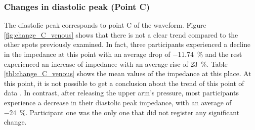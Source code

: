 \subsubsection{Changes in diastolic peak (Point C)}
\label{section apa 3.1.3}
The diastolic peak corresponds to point C of the waveform. Figure \ref{fig:change_C_venous} shows that there is not a clear trend compared to the other spots previously examined. In fact, three participants experienced a decline in the impedance at this point with an average drop of \SI{-11.74}{\percent} and the rest experienced an increase of impedance with an average rise of \SI{23}{\percent}. Table \ref{tbl:change_C_venous} shows the mean values of the impedance at this place. At this point, it is not possible to get a conclusion about the trend of this point of data . In contrast, after releasing the upper arm's pressure, most participants experience a decrease in their diastolic peak impedance, with an average of \SI{-24}{\percent}. Participant one was the only one that did not register any significant change. 

